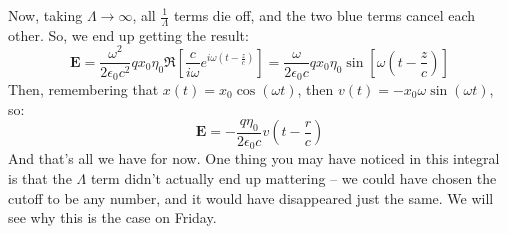 Now, taking \( \Lambda \to \infty \), all \( \frac{1}{\Lambda} \) terms die off, and the two blue terms
cancel each other. So, we end up getting the result:
\[
	\mathbf{E} = \frac{\omega^2}{2 \epsilon_0 c^2}qx_0 \eta_0 \Re\left[ \frac{c}{i \omega} e^{i \omega \left(
	t - \frac{z}{c}\right)} \right] = \frac{\omega}{2 \epsilon_0 c}q x_0 \eta_0 \sin\left[ \omega\left( t -
\frac{z}{c} \right) \right]
\]
Then, remembering that \( x(t) = x_0 \cos(\omega t) \), then \( v(t) = -x_0 \omega \sin(\omega t) \), so:
\[
	\mathbf{E} = -\frac{q \eta_0}{2 \epsilon_0 c }v\left( t - \frac{r}{c} \right)
\]
And that's all we have for now. One thing you may have noticed in this integral is that the \( \Lambda \)
term didn't actually end up mattering -- we could have chosen the cutoff to be any number, and it would have
disappeared just the same. We will see why this is the case on Friday.    

 
  
